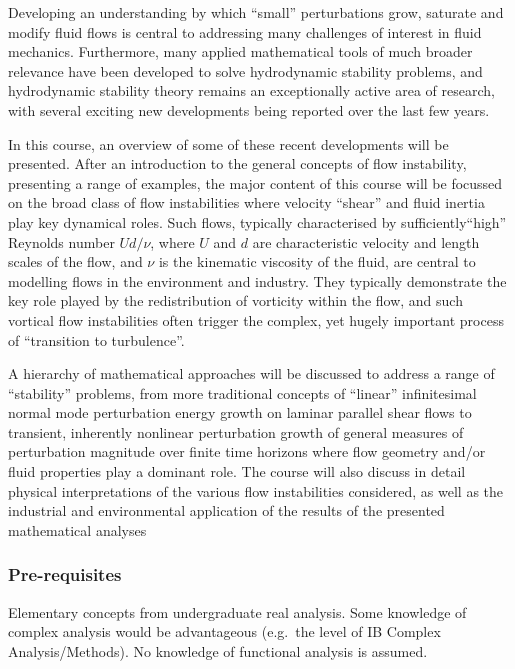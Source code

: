 \documentclass[a4paper]{article}
\begin{document}
\maketitle
{\small
\setlength{\parindent}{0em}
\setlength{\parskip}{1em}
Developing an understanding by which ``small'' perturbations grow, saturate and modify fluid flows is central to addressing many challenges of interest in fluid mechanics. Furthermore, many applied mathematical tools of much broader relevance have been developed to solve hydrodynamic stability problems, and hydrodynamic stability theory remains an exceptionally active area of research, with several exciting new developments being reported over the last few years.

In this course, an overview of some of these recent developments will be presented. After an introduction to the general concepts of flow instability, presenting a range of examples, the major content of this course will be focussed on the broad class of flow instabilities where velocity ``shear'' and fluid inertia play key dynamical roles. Such flows, typically characterised by sufficiently“high” Reynolds number $Ud/\nu$, where $U$ and $d$ are characteristic velocity and length scales of the flow, and $\nu$ is the kinematic viscosity of the fluid, are central to modelling flows in the environment and industry. They typically demonstrate the key role played by the redistribution of vorticity within the flow, and such vortical flow instabilities often trigger the complex, yet hugely important process of ``transition to turbulence''.

A hierarchy of mathematical approaches will be discussed to address a range of ``stability'' problems, from more traditional concepts of ``linear'' infinitesimal normal mode perturbation energy growth on laminar parallel shear flows to transient, inherently nonlinear perturbation growth of general measures of perturbation magnitude over finite time horizons where flow geometry and/or fluid properties play a dominant role. The course will also discuss in detail physical interpretations of the various flow instabilities considered, as well as the industrial and environmental application of the results of the presented mathematical analyses

\subsubsection*{Pre-requisites}
Elementary concepts from undergraduate real analysis. Some knowledge of complex analysis would be advantageous (e.g.\ the level of IB Complex Analysis/Methods). No knowledge of functional analysis is assumed.
}
\tableofcontents
\end{document}
